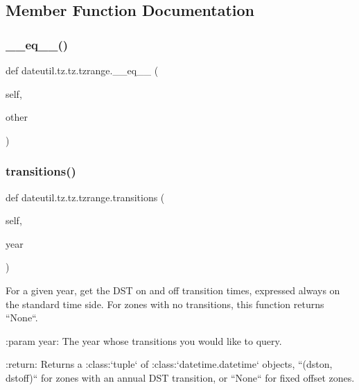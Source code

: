 \subsection{Member Function Documentation}
\mbox{\label{classdateutil_1_1tz_1_1tz_1_1tzrange_af334a07f2b7e87f5fda0834843adce3a}} 
\subsubsection{\texorpdfstring{\+\_\+\+\_\+eq\+\_\+\+\_\+()}{\_\_eq\_\_()}}
{\footnotesize\ttfamily def dateutil.\+tz.\+tz.\+tzrange.\+\_\+\+\_\+eq\+\_\+\+\_\+ (\begin{DoxyParamCaption}\item[{}]{self,  }\item[{}]{other }\end{DoxyParamCaption})}

\mbox{\label{classdateutil_1_1tz_1_1tz_1_1tzrange_a1d065e90e5f92050296b7d419dadb3e0}} 
\subsubsection{\texorpdfstring{transitions()}{transitions()}}
{\footnotesize\ttfamily def dateutil.\+tz.\+tz.\+tzrange.\+transitions (\begin{DoxyParamCaption}\item[{}]{self,  }\item[{}]{year }\end{DoxyParamCaption})}

\begin{DoxyVerb}For a given year, get the DST on and off transition times, expressed
always on the standard time side. For zones with no transitions, this
function returns ``None``.

:param year:
    The year whose transitions you would like to query.

:return:
    Returns a :class:`tuple` of :class:`datetime.datetime` objects,
    ``(dston, dstoff)`` for zones with an annual DST transition, or
    ``None`` for fixed offset zones.
\end{DoxyVerb}
 

